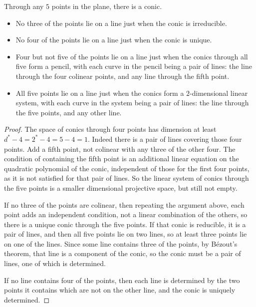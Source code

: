 \begin{lemma}\label{lemma:conics.5.points}
Through any \(5\) points in the plane, there is a conic.
\begin{itemize}
\item
No three of the points lie on a line just when the conic is irreducible.
\item
No four of the points lie on a line just when the conic is unique.
\item
Four but not five of the points lie on a line just when the conics through all five form a pencil, with each curve in the pencil being a pair of lines: the line through the four colinear points, and any line through the fifth point.
\item
All five points lie on a line just when the conics form a \(2\)-dimensional linear system, with each curve in the system being a pair of lines: the line through the five points, and any other line.
\end{itemize}
\end{lemma}
\begin{proof}
The space of conics through four points has dimension at least \(d^*-4=2^*-4=5-4=1\).
Indeed there is a pair of lines covering those four points.
Add a fifth point, not colinear with any three of the other four.
The condition of containing the fifth point is an additional linear equation on the quadratic polynomial of the conic, independent of those for the first four points, as it is not satisfied for that pair of lines.
So the linear system of conics through the five points is a smaller dimensional projective space, but still not empty.

If no three of the points are colinear, then repeating the argument above, each point adds an independent condition, not a linear combination of the others, so there is a unique conic through the five points.
If that conic is reducible, it is a pair of lines, and then all five points lie on two lines, so at least three points lie on one of the lines.
Since some line contains three of the points, by B\'ezout's theorem, that line is a component of the conic, so the conic must be a pair of lines, one of which is determined.

If no line contains four of the points, then each line is determined by the two points it contains which are not on the other line, and the conic is uniquely determined.
\end{proof}

